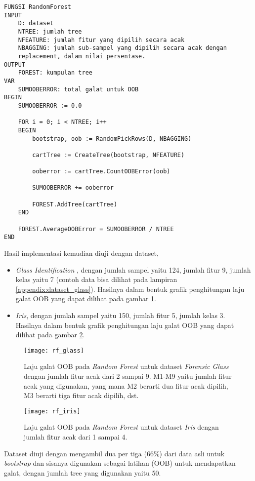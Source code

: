 \begin{lstlisting}
FUNGSI RandomForest
INPUT
	D: dataset
	NTREE: jumlah tree
	NFEATURE: jumlah fitur yang dipilih secara acak
	NBAGGING: jumlah sub-sampel yang dipilih secara acak dengan
	replacement, dalam nilai persentase.
OUTPUT
	FOREST: kumpulan tree
VAR
	SUMOOBERROR: total galat untuk OOB
BEGIN
	SUMOOBERROR := 0.0

	FOR i = 0; i < NTREE; i++
	BEGIN
		bootstrap, oob := RandomPickRows(D, NBAGGING)

		cartTree := CreateTree(bootstrap, NFEATURE)

		ooberror := cartTree.CountOOBError(oob)

		SUMOOBERROR += ooberror

		FOREST.AddTree(cartTree)
	END

	FOREST.AverageOOBError = SUMOOBERROR / NTREE
END
\end{lstlisting}

Hasil implementasi kemudian diuji dengan dataset,
\begin{itemize}
\item \textit{Glass Identification}
\cite{evett1987rule}, dengan jumlah sampel yaitu 124, jumlah fitur 9, jumlah
kelas yaitu 7 (contoh data bisa dilihat pada lampiran
\ref{appendix:dataset_glass}).
Hasilnya dalam bentuk grafik penghitungan laju galat OOB yang dapat dilihat
pada gambar \ref{fig:rf_glass}.

\item \textit{Iris}, dengan jumlah sampel yaitu 150, jumlah fitur 5, jumlah
kelas 3.
Hasilnya dalam bentuk grafik penghitungan laju galat OOB yang dapat dilihat
pada gambar \ref{fig:rf_iris}.
\end{itemize}

\begin{figure}[t]
	\centering
	\texttt{[image: rf\_glass]}
	\caption{Laju galat OOB pada \textit{Random Forest} untuk dataset
	\textit{Forensic Glass} dengan jumlah fitur acak dari 2 sampai 9.
	M1-M9 yaitu jumlah fitur acak yang digunakan, yang mana M2 berarti dua
	fitur acak dipilih, M3 berarti tiga fitur acak dipilih, dst.
	}
	\label{fig:rf_glass}
\end{figure}

\begin{figure}[t]
	\centering
	\texttt{[image: rf\_iris]}
	\caption{Laju galat OOB pada \textit{Random Forest} untuk dataset
	\textit{Iris} dengan jumlah fitur acak dari 1 sampai 4.}
	\label{fig:rf_iris}
\end{figure}


Dataset diuji dengan mengambil dua per tiga (66\%) dari data asli untuk
\textit{bootstrap} dan sisanya digunakan sebagai latihan (OOB) untuk
mendapatkan galat, dengan jumlah tree yang digunakan yaitu 50.
